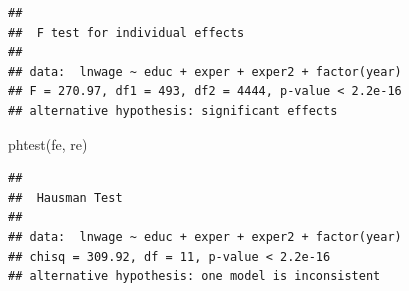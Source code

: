 \documentclass[
]{article}
\newenvironment{Shaded}{\begin{snugshade}}{\end{snugshade}}
\newcommand{\FunctionTok}[1]{\textcolor[rgb]{0.00,0.00,0.00}{#1}}
\newcommand{\NormalTok}[1]{#1}
\begin{document}
\begin{verbatim}
## 
##  F test for individual effects
## 
## data:  lnwage ~ educ + exper + exper2 + factor(year)
## F = 270.97, df1 = 493, df2 = 4444, p-value < 2.2e-16
## alternative hypothesis: significant effects
\end{verbatim}

\begin{Shaded}
\begin{Highlighting}[]
  \FunctionTok{phtest}\NormalTok{(fe, re)}
\end{Highlighting}
\end{Shaded}

\begin{verbatim}
## 
##  Hausman Test
## 
## data:  lnwage ~ educ + exper + exper2 + factor(year)
## chisq = 309.92, df = 11, p-value < 2.2e-16
## alternative hypothesis: one model is inconsistent
\end{verbatim}
\end{document}
